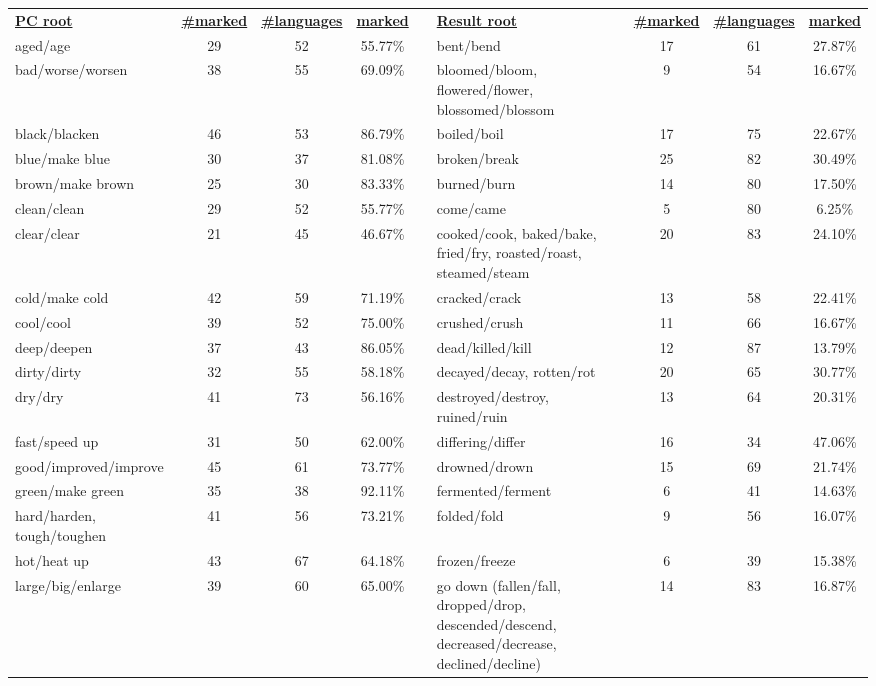 \begin{tabular}{p{3cm}ccccp{3cm}ccc}
\underline{\textbf{PC root}} & \underline{\textbf{\#marked}} & \underline{\textbf{\#languages}} & \underline{\textbf{marked}} & & \underline{\textbf{Result root}} & \underline{\textbf{\#marked}} & \underline{\textbf{\#languages}} & \underline{\textbf{marked}} \\
aged/age & 29 & 52 & 55.77\% & & bent/bend & 17 & 61 & 27.87\% \\
bad/worse/worsen & 38 & 55 & 69.09\% & & bloomed/bloom, flowered/flower, blossomed/blossom & 9 & 54 & 16.67\% \\
black/blacken & 46 & 53 & 86.79\% & & boiled/boil & 17 & 75 & 22.67\% \\
blue/make blue & 30 & 37 & 81.08\% & & broken/break & 25 & 82 & 30.49\% \\
brown/make brown & 25 & 30 & 83.33\% & & burned/burn & 14 & 80 & 17.50\% \\
clean/clean & 29 & 52 & 55.77\% & & come/came & 5 & 80 & 6.25\% \\
clear/clear & 21 & 45 & 46.67\% & & cooked/cook, baked/bake, fried/fry, roasted/roast, steamed/steam & 20 & 83 & 24.10\% \\
cold/make cold & 42 & 59 & 71.19\% & & cracked/crack & 13 & 58 & 22.41\% \\
cool/cool & 39 & 52 & 75.00\% & & crushed/crush & 11 & 66 & 16.67\% \\
deep/deepen & 37 & 43 & 86.05\% & & dead/killed/kill & 12 & 87 & 13.79\% \\
dirty/dirty & 32 & 55 & 58.18\% & & decayed/decay, rotten/rot & 20 & 65 & 30.77\% \\
dry/dry & 41 & 73 & 56.16\% & & destroyed/destroy, ruined/ruin & 13 & 64 & 20.31\% \\
fast/speed up & 31 & 50 & 62.00\% & & differing/differ & 16 & 34 & 47.06\% \\
good/improved/improve & 45 & 61 & 73.77\% & & drowned/drown & 15 & 69 & 21.74\% \\
green/make green & 35 & 38 & 92.11\% & & fermented/ferment & 6 & 41 & 14.63\% \\
hard/harden, tough/toughen & 41 & 56 & 73.21\% & & folded/fold & 9 & 56 & 16.07\% \\
hot/heat up & 43 & 67 & 64.18\% & & frozen/freeze & 6 & 39 & 15.38\% \\
large/big/enlarge & 39 & 60 & 65.00\% & & go down (fallen/fall, dropped/drop, descended/descend, decreased/decrease, declined/decline) & 14 & 83 & 16.87\% \\

\end{tabular}
